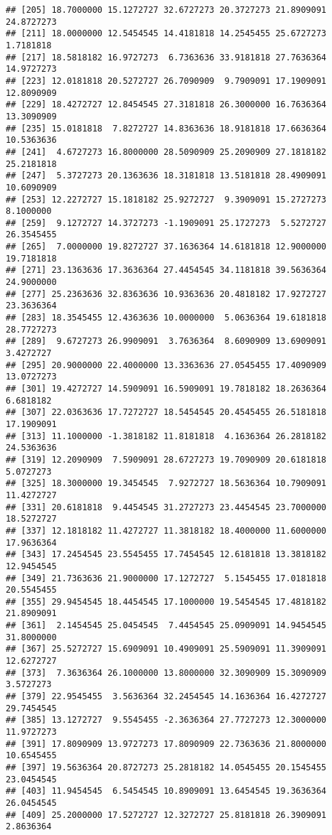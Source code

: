 \documentclass[]{book}
\begin{document}
\begin{verbatim}
## [205] 18.7000000 15.1272727 32.6727273 20.3727273 21.8909091 24.8727273
## [211] 18.0000000 12.5454545 14.4181818 14.2545455 25.6727273  1.7181818
## [217] 18.5818182 16.9727273  6.7363636 33.9181818 27.7636364 14.9727273
## [223] 12.0181818 20.5272727 26.7090909  9.7909091 17.1909091 12.8090909
## [229] 18.4272727 12.8454545 27.3181818 26.3000000 16.7636364 13.3090909
## [235] 15.0181818  7.8272727 14.8363636 18.9181818 17.6636364 10.5363636
## [241]  4.6727273 16.8000000 28.5090909 25.2090909 27.1818182 25.2181818
## [247]  5.3727273 20.1363636 18.3181818 13.5181818 28.4909091 10.6090909
## [253] 12.2272727 15.1818182 25.9272727  9.3909091 15.2727273  8.1000000
## [259]  9.1272727 14.3727273 -1.1909091 25.1727273  5.5272727 26.3545455
## [265]  7.0000000 19.8272727 37.1636364 14.6181818 12.9000000 19.7181818
## [271] 23.1363636 17.3636364 27.4454545 34.1181818 39.5636364 24.9000000
## [277] 25.2363636 32.8363636 10.9363636 20.4818182 17.9272727 23.3636364
## [283] 18.3545455 12.4363636 10.0000000  5.0636364 19.6181818 28.7727273
## [289]  9.6727273 26.9909091  3.7636364  8.6090909 13.6909091  3.4272727
## [295] 20.9000000 22.4000000 13.3363636 27.0545455 17.4090909 13.0727273
## [301] 19.4272727 14.5909091 16.5909091 19.7818182 18.2636364  6.6818182
## [307] 22.0363636 17.7272727 18.5454545 20.4545455 26.5181818 17.1909091
## [313] 11.1000000 -1.3818182 11.8181818  4.1636364 26.2818182 24.5363636
## [319] 12.2090909  7.5909091 28.6727273 19.7090909 20.6181818  5.0727273
## [325] 18.3000000 19.3454545  7.9272727 18.5636364 10.7909091 11.4272727
## [331] 20.6181818  9.4454545 31.2727273 23.4454545 23.7000000 18.5272727
## [337] 12.1818182 11.4272727 11.3818182 18.4000000 11.6000000 17.9636364
## [343] 17.2454545 23.5545455 17.7454545 12.6181818 13.3818182 12.9454545
## [349] 21.7363636 21.9000000 17.1272727  5.1545455 17.0181818 20.5545455
## [355] 29.9454545 18.4454545 17.1000000 19.5454545 17.4818182 21.8909091
## [361]  2.1454545 25.0454545  7.4454545 25.0909091 14.9454545 31.8000000
## [367] 25.5272727 15.6909091 10.4909091 25.5909091 11.3909091 12.6272727
## [373]  7.3636364 26.1000000 13.8000000 32.3090909 15.3090909  3.5727273
## [379] 22.9545455  3.5636364 32.2454545 14.1636364 16.4272727 29.7454545
## [385] 13.1272727  9.5545455 -2.3636364 27.7727273 12.3000000 11.9727273
## [391] 17.8090909 13.9727273 17.8090909 22.7363636 21.8000000 10.6545455
## [397] 19.5636364 20.8727273 25.2818182 14.0545455 20.1545455 23.0454545
## [403] 11.9454545  6.5454545 10.8909091 13.6454545 19.3636364 26.0454545
## [409] 25.2000000 17.5272727 12.3272727 25.8181818 26.3909091  2.8636364

\end{verbatim}
\end{document}

